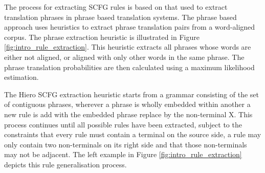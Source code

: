 The process for extracting SCFG rules is based on that used to extract translation phrases in phrase based translation systems. 
The phrase based approach \cite{koehn03} uses heuristics to extract phrase translation pairs from a word-aligned corpus. 
The phrase extraction heuristic is illustrated in Figure \ref{fig:intro_rule_extraction}. 
This heuristic extracts all phrases whose words are either not aligned, or aligned with only other words in the same phrase. 
The phrase translation probabilities are then calculated using a maximum likelihood estimation. 

The Hiero \cite{chiang07hierarchical} SCFG extraction heuristic starts from a grammar consisting of the set of contiguous phrases, wherever a phrase is wholly embedded within another a new rule is add with the embedded phrase replace by the non-terminal X. 
This process continues until all possible rules have been extracted, subject to the constraints that every rule must contain a terminal on the source side, a rule may only contain two non-terminals on its right side and that those non-terminals may not be adjacent.
The left example in Figure \ref{fig:intro_rule_extraction} depicts this rule generalisation process. 
